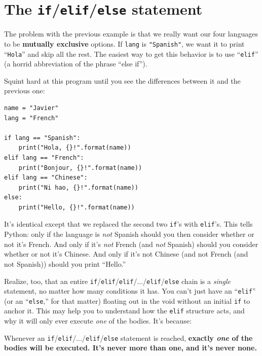 \section{The \texttt{if}/\texttt{elif}/\texttt{else} statement}


The problem with the previous example is that we really want our four languages
to be \textbf{mutually exclusive} options. If \texttt{lang} is
\texttt{"Spanish"}, we want it to print ``\texttt{Hola}'' and skip all the
rest. The easiest way to get this behavior is to use ``\texttt{elif}'' (a
horrid abbreviation of the phrase ``else if'').

Squint hard at this program until you see the differences between it and the
previous one:

\begin{Verbatim}[fontsize=\small,samepage=true,frame=single,framesep=3mm]
name = "Javier"
lang = "French"

if lang == "Spanish":
    print("Hola, {}!".format(name))
elif lang == "French":
    print("Bonjour, {}!".format(name))
elif lang == "Chinese":
    print("Ni hao, {}!".format(name))
else:
    print("Hello, {}!".format(name))
\end{Verbatim}

It's identical except that we replaced the second two \texttt{if}'s with
\texttt{elif}'s. This tells Python: only if the language is \textit{not}
Spanish should you then consider whether or not it's French. And only if it's
\textit{not} French (and \textit{not} Spanish) should you consider whether or
not it's Chinese. And only if it's not Chinese (and not French (and not
Spanish)) should you print ``Hello.''

Realize, too, that an entire
\texttt{if}/\texttt{elif}/\texttt{elif}/.../\texttt{elif}/\texttt{else} chain
is a \textit{single} statement, no matter how many conditions it has. You can't
just have an ``\texttt{elif}'' (or an ``\texttt{else},'' for that matter)
floating out in the void without an initial \texttt{if} to anchor it. This may
help you to understand how the \texttt{elif} structure acts, and why it will
only ever execute \textit{one} of the bodies. It's because:

\begin{shaded}
Whenever an \texttt{if}/\texttt{elif}/.../\texttt{elif}/\texttt{else} statement
is reached, \textbf{exactly \textit{one} of the bodies will be executed. It's
never more than one, and it's never none.}
\end{shaded}


